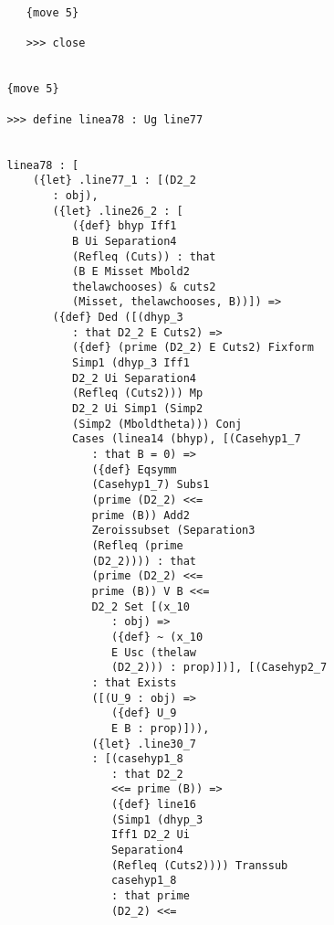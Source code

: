 \documentclass[12pt]{article}
\begin{document}
\begin{verbatim}
                  {move 5}

                  >>> close


               {move 5}

               >>> define linea78 : Ug line77


               linea78 : [
                   ({let} .line77_1 : [(D2_2 
                      : obj), 
                      ({let} .line26_2 : [
                         ({def} bhyp Iff1 
                         B Ui Separation4 
                         (Refleq (Cuts)) : that 
                         (B E Misset Mbold2 
                         thelawchooses) & cuts2 
                         (Misset, thelawchooses, B))]) => 
                      ({def} Ded ([(dhyp_3 
                         : that D2_2 E Cuts2) => 
                         ({def} (prime (D2_2) E Cuts2) Fixform 
                         Simp1 (dhyp_3 Iff1 
                         D2_2 Ui Separation4 
                         (Refleq (Cuts2))) Mp 
                         D2_2 Ui Simp1 (Simp2 
                         (Simp2 (Mboldtheta))) Conj 
                         Cases (linea14 (bhyp), [(Casehyp1_7 
                            : that B = 0) => 
                            ({def} Eqsymm 
                            (Casehyp1_7) Subs1 
                            (prime (D2_2) <<= 
                            prime (B)) Add2 
                            Zeroissubset (Separation3 
                            (Refleq (prime 
                            (D2_2)))) : that 
                            (prime (D2_2) <<= 
                            prime (B)) V B <<= 
                            D2_2 Set [(x_10 
                               : obj) => 
                               ({def} ~ (x_10 
                               E Usc (thelaw 
                               (D2_2))) : prop)])], [(Casehyp2_7 
                            : that Exists 
                            ([(U_9 : obj) => 
                               ({def} U_9 
                               E B : prop)])), 
                            ({let} .line30_7 
                            : [(casehyp1_8 
                               : that D2_2 
                               <<= prime (B)) => 
                               ({def} line16 
                               (Simp1 (dhyp_3 
                               Iff1 D2_2 Ui 
                               Separation4 
                               (Refleq (Cuts2)))) Transsub 
                               casehyp1_8 
                               : that prime 
                               (D2_2) <<= 

\end{verbatim}
\end{document}
